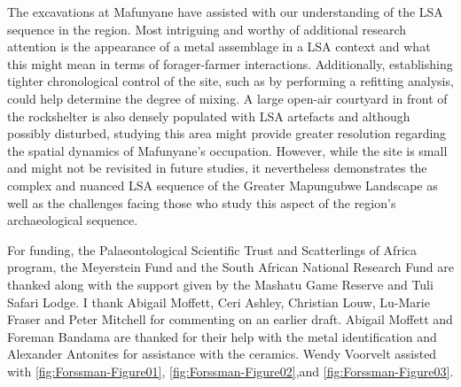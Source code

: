 The excavations at Mafunyane have assisted with our understanding of the LSA sequence in the region. Most intriguing and worthy of additional research attention is the appearance of a metal assemblage in a LSA context and what this might mean in terms of forager-farmer interactions. Additionally, establishing tighter chronological control of the site, such as by performing a refitting analysis, could help determine the degree of mixing. A large open-air courtyard in front of the rockshelter is also densely populated with LSA artefacts and although possibly disturbed, studying this area might provide greater resolution regarding the spatial dynamics of Mafunyane’s occupation. However, while the site is small and might not be revisited in future studies, it nevertheless demonstrates the complex and nuanced LSA sequence of the Greater Mapungubwe Landscape as well as the challenges facing those who study this aspect of the region’s archaeological sequence.

\IJSRAseparator
For  funding, the Palaeontological Scientific Trust and Scatterlings of Africa program, the Meyerstein Fund and the South African National Research Fund are thanked along with the support given by the Mashatu Game Reserve and Tuli Safari Lodge. I thank Abigail Moffett, Ceri Ashley, Christian Louw, Lu-Marie Fraser and Peter Mitchell for commenting on an earlier draft. Abigail Moffett and Foreman Bandama are thanked for their help with the metal identification and Alexander Antonites for assistance with the ceramics. Wendy Voorvelt assisted with \cref{fig:Forssman-Figure01}, \cref{fig:Forssman-Figure02},and \cref{fig:Forssman-Figure03}.



\IJSRAclosing
%